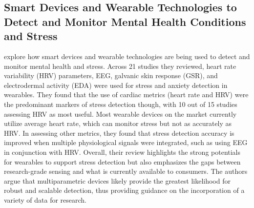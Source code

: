 \documentclass[12pt,letterpaper]{article}
\begin{document}
\subsection{Smart Devices and Wearable Technologies to Detect and Monitor Mental Health Conditions and Stress}
\cite{hickey2021smart} explore how smart devices and wearable technologies are being used to detect and monitor mental health and stress. Across 21 studies they reviewed, heart rate variability (HRV) parameters, EEG, galvanic skin response (GSR), and electrodermal activity (EDA) were used for stress and anxiety detection in wearables. They found that the use of cardiac metrics (heart rate and HRV) were the predominant markers of stress detection though, with 10 out of 15 studies assessing HRV as most useful. Most wearable devices on the market currently utilize average heart rate, which can monitor stress but not as accurately as HRV. In assessing other metrics, they found that stress detection accuracy is improved when multiple physiological signals were integrated, such as using EEG in conjunction with HRV. Overall, their review highlights the strong potentials for wearables to support stress detection but also emphasizes the gaps between research-grade sensing and what is currently available to consumers. The authors argue that multiparametric devices likely provide the greatest likelihood for robust and scalable detection, thus providing guidance on the incorporation of a variety of data for research.
\end{document}
